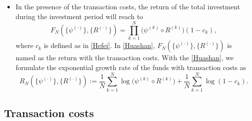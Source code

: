 \documentclass[11pt]{article}
\numberwithin{equation}{section}
\begin{document}
\begin{itemize}
\item In the presence of the transaction costs,  the return of the total investment during the investment period  will reach to 
\begin{equation}\label{Huashan}
F_N(\{\psi^{(\cdot)}\},\{R^{(\cdot)}\}) = \prod_{k=1}^N\Big(\psi^{(k)}\diamond R^{(k)}\Big)(1-c_k),
\end{equation}
where $c_k$ is defined as in \eqref{Hefei}.  In \eqref{Huashan},  $F_N(\{\psi^{(\cdot)}\},\{R^{(\cdot)}\})$ is named as the return with the transaction costs. With the \eqref{Huashan},  we formulate the 
exponential growth rate of the funds with transaction costs as 
\begin{equation}\label{P-B}
R_N(\{\psi^{(\cdot)}\},\{R^{(\cdot)}\}) := \frac{1}{N}\sum_{k=1}^{N}\log \bigg( \psi^{(k)}\diamond R^{(k)}\bigg)+\frac{1}{N}\sum_{k=1}^{N}\log (1-c_k).
\end{equation}
\end{itemize}

\subsection{Transaction costs}
\end{document}
